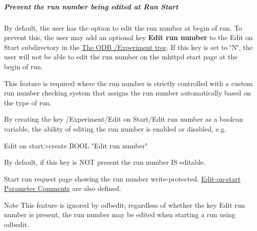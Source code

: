 \par
\hypertarget{RC_mhttpd_Start_page_RC_Prevent_Edit_RN}{}\subparagraph{Prevent the run number being edited at Run Start}\label{RC_mhttpd_Start_page_RC_Prevent_Edit_RN}
\label{RC_mhttpd_Start_page_RC_Edit_RN}
\hypertarget{RC_mhttpd_Start_page_RC_Edit_RN}{}


By default, the user has the option to edit the run number at begin of run. To prevent this, the user may add an optional key {\bfseries Edit run number} to the Edit on Start subdirectory in the \hyperlink{RC_customize_ODB_RC_ODB_Experiment_Tree}{The ODB /Experiment tree}. If this key is set to \char`\"{}N\char`\"{}, the user will not be able to edit the run number on the mhttpd start page at the begin of run.

This feature is required where the run number is strictly controlled with a custom run number checking system that assigns the run number automatically based on the type of run.

By creating the key /Experiment/Edit on Start/Edit run number as a boolean variable, the ability of editing the run number is enabled or disabled, e.g. 
\begin{DoxyCode}
Edit on start>create BOOL "Edit run number"
\end{DoxyCode}


By default, if this key is NOT present the run number IS editable.

\par
 \begin{center} Start run request page showing the run number write-\/protected. \hyperlink{RC_mhttpd_Start_page_RC_Edit_PC}{Edit-\/on-\/start Parameter Comments} are also defined. \par
\par
\par
  \end{center}  \par
\par
\par
 \par


\begin{DoxyNote}{Note}
This feature is ignored by odbedit; regardless of whether the key Edit run number is present, the run number may be edited when starting a run using odbedit.
\end{DoxyNote}
\par
\par
\par




